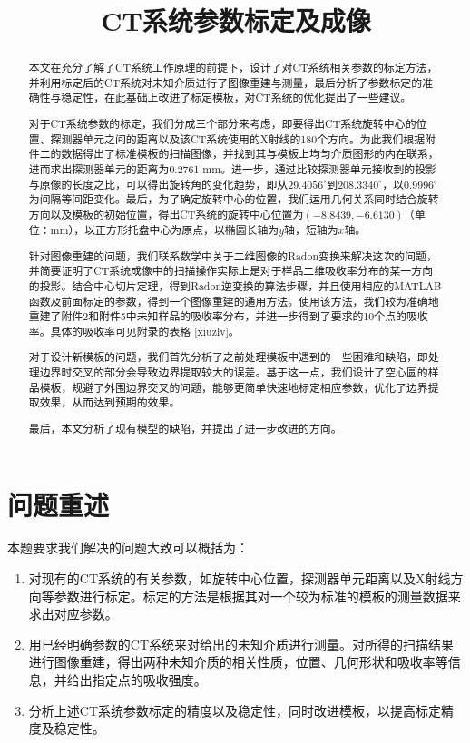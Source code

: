 \documentclass[withoutpreface,bwprint]{cumcmthesis} %
\title{CT系统参数标定及成像}
\begin{document}
\maketitle
\begin{abstract}

  本文在充分了解了CT系统工作原理的前提下，设计了对CT系统相关参数的标定方法，并利用标定后的CT系统对未知介质进行了图像重建与测量，最后分析了参数标定的准确性与稳定性，在此基础上改进了标定模板，对CT系统的优化提出了一些建议。

  对于CT系统参数的标定，我们分成三个部分来考虑，即要得出CT系统旋转中心的位置、探测器单元之间的距离以及该CT系统使用的X射线的180个方向。为此我们根据附件二的数据得出了标准模板的扫描图像，并找到其与模板上均匀介质图形的内在联系，进而求出探测器单元的距离为0.2761 mm。进一步，通过比较探测器单元接收到的投影与原像的长度之比，可以得出旋转角的变化趋势，即从$29.4056^\circ$到$208.3340^\circ$，以$0.9996^\circ$为间隔等间距变化。最后，为了确定旋转中心的位置，我们运用几何关系同时结合旋转方向以及模板的初始位置，得出CT系统的旋转中心位置为$(-8.8439, -6.6130)$（单位：mm），以正方形托盘中心为原点，以椭圆长轴为$y$轴，短轴为$x$轴。

  针对图像重建的问题，我们联系数学中关于二维图像的Radon变换来解决这次的问题，并简要证明了CT系统成像中的扫描操作实际上是对于样品二维吸收率分布的某一方向的投影。结合中心切片定理，得到Radon逆变换的算法步骤，并且使用相应的MATLAB函数及前面标定的参数，得到一个图像重建的通用方法。使用该方法，我们较为准确地重建了附件2和附件5中未知样品的吸收率分布，并进一步得到了要求的10个点的吸收率。具体的吸收率可见附录的表格 \ref{xiuzlv}。

  对于设计新模板的问题，我们首先分析了之前处理模板中遇到的一些困难和缺陷，即处理边界时交叉的部分会导致边界提取较大的误差。基于这一点，我们设计了空心圆的样品模板，规避了外围边界交叉的问题，能够更简单快速地标定相应参数，优化了边界提取效果，从而达到预期的效果。

  最后，本文分析了现有模型的缺陷，并提出了进一步改进的方向。

\end{abstract}

\section{问题重述}

  本题要求我们解决的问题大致可以概括为：
  \begin{enumerate}
    \item 对现有的CT系统的有关参数，如旋转中心位置，探测器单元距离以及X射线方向等参数进行标定。标定的方法是根据其对一个较为标准的模板的测量数据来求出对应参数。
    \item 用已经明确参数的CT系统来对给出的未知介质进行测量。对所得的扫描结果进行图像重建，得出两种未知介质的相关性质，位置、几何形状和吸收率等信息，并给出指定点的吸收强度。
    \item 分析上述CT系统参数标定的精度以及稳定性，同时改进模板，以提高标定精度及稳定性。
  \end{enumerate}
\end{document}
